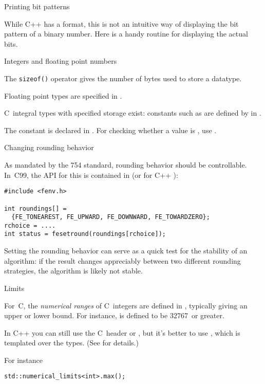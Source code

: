  {Printing bit patterns}

While C++ has a  format,
this is not an intuitive way of displaying the bit pattern of a
binary number.
Here is a handy routine for displaying the actual bits.


 {Integers and floating point numbers}
\label{sec:sizeof}

The \texttt{sizeof()} operator gives the
number of bytes used to store a datatype.

Floating point types are specified in .

C~integral types with specified storage exist: constants such as
 are defined by  in .

The constant  is declared in .
For checking whether a value is , use .

 {Changing rounding behavior}
\label{sec:fenvh}

As mandated by the 754 standard, rounding behavior should be controllable.
In~C99, the API for this is contained in  (or for
C++ ):
\begin{lstlisting}
#include <fenv.h>

int roundings[] =
  {FE_TONEAREST, FE_UPWARD, FE_DOWNWARD, FE_TOWARDZERO};
rchoice = ....
int status = fesetround(roundings[rchoice]);            
\end{lstlisting}

Setting the rounding behavior can serve as a quick test for the stability
of an algorithm: if the result changes appreciably between two different
rounding strategies, the algorithm is likely not stable.

 {Limits}

For~C,
the \emph{numerical ranges}
of C~integers are defined in ,
typically giving an upper or lower bound.
For instance,  is defined to be 32767~or greater.

In C++
you can still use the C~header  or
, but it's better to use
, which is templated over the types.
(See  for details.)

For instance
\lstset{language=C++}
\begin{lstlisting}
std::numerical_limits<int>.max();
\end{lstlisting}

